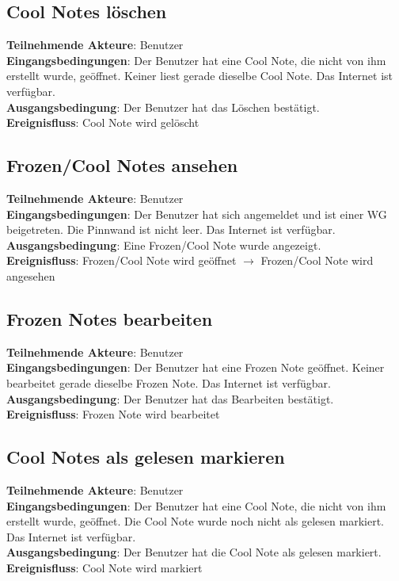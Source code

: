 \documentclass[a4paper]{scrreprt}
\begin{document}
        	\subsection{Cool Notes löschen}
        	\textbf{Teilnehmende Akteure}: Benutzer \\
        	\textbf{Eingangsbedingungen}: Der Benutzer hat eine Cool Note, die nicht von ihm erstellt wurde, geöffnet. Keiner liest gerade dieselbe Cool Note. Das Internet ist verfügbar. \\
        	\textbf{Ausgangsbedingung}: Der Benutzer hat das Löschen bestätigt. \\
        	\textbf{Ereignisfluss}: Cool Note wird gelöscht
        	
        	\subsection{Frozen/Cool Notes ansehen}
        	\textbf{Teilnehmende Akteure}: Benutzer \\
        	\textbf{Eingangsbedingungen}: Der Benutzer hat sich angemeldet und ist einer WG beigetreten. Die Pinnwand ist nicht leer. Das Internet ist verfügbar. \\
        	\textbf{Ausgangsbedingung}: Eine Frozen/Cool Note wurde angezeigt. \\
        	\textbf{Ereignisfluss}: Frozen/Cool Note wird geöffnet $\rightarrow$ Frozen/Cool Note wird angesehen
        	
        	\subsection{Frozen Notes bearbeiten}
        	\textbf{Teilnehmende Akteure}: Benutzer \\
        	\textbf{Eingangsbedingungen}: Der Benutzer hat eine Frozen Note geöffnet. Keiner bearbeitet gerade dieselbe Frozen Note. Das Internet ist verfügbar. \\
        	\textbf{Ausgangsbedingung}: Der Benutzer hat das Bearbeiten bestätigt. \\
        	\textbf{Ereignisfluss}: Frozen Note wird bearbeitet
        	
        	\subsection{Cool Notes als gelesen markieren}
        	\textbf{Teilnehmende Akteure}: Benutzer \\
        	\textbf{Eingangsbedingungen}: Der Benutzer hat eine Cool Note, die nicht von ihm erstellt wurde, geöffnet. Die Cool Note wurde noch nicht als gelesen markiert. Das Internet ist verfügbar. \\
        	\textbf{Ausgangsbedingung}: Der Benutzer hat die Cool Note als gelesen markiert. \\
        	\textbf{Ereignisfluss}: Cool Note wird markiert
        	
\end{document}

